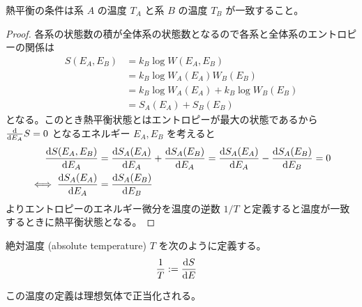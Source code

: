 \documentclass[a4paper,11pt]{jlreq}
\begin{document}
\begin{theorem}
  熱平衡の条件は系 $A$ の温度 $T_A$ と系 $B$ の温度 $T_B$ が一致すること。
\end{theorem}
\begin{proof}
  各系の状態数の積が全体系の状態数となるので各系と全体系のエントロピーの関係は
  \begin{align}
    S(E_A, E_B) & = k_B\log W(E_A, E_B)                 \\
                & = k_B\log W_A(E_A)W_B(E_B)            \\
                & = k_B\log W_A(E_A) + k_B\log W_B(E_B) \\
                & = S_A(E_A) + S_B(E_B)
  \end{align}
  となる。このとき熱平衡状態とはエントロピーが最大の状態であるから $\diff*{S}{E_A} = 0$ となるエネルギー $E_A, E_B$ を考えると
  \begin{align}
    \diff{S(E_A, E_B)}{E_A}   & = \diff{S_A(E_A)}{E_A} + \diff{S_A(E_B)}{E_A} = \diff{S_A(E_A)}{E_A} - \diff{S_A(E_B)}{E_B} = 0 \\
    \iff \diff{S_A(E_A)}{E_A} & = \diff{S_A(E_B)}{E_B}
  \end{align}
  よりエントロピーのエネルギー微分を温度の逆数 $1/T$ と定義すると温度が一致するときに熱平衡状態となる。
\end{proof}

\begin{definition}
  絶対温度 (absolute temperature) $T$ を次のように定義する。
  \begin{align}
    \frac{1}{T} & := \diff{S}{E}
  \end{align}
\end{definition}

この温度の定義は理想気体で正当化される。
\end{document}
